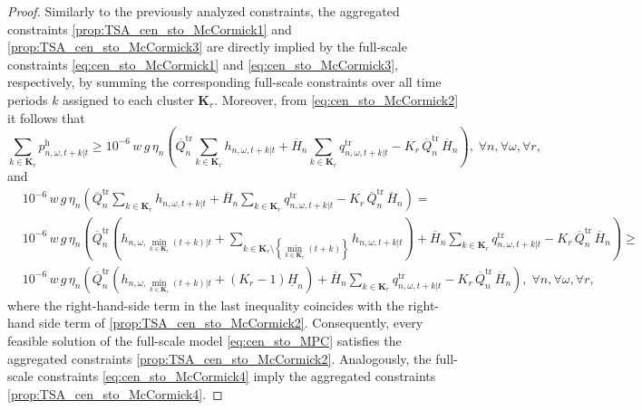 \documentclass[a4paper,fleqn]{cas-sc}
\begin{document}
\begin{proof}
Similarly to the previously analyzed constraints, the aggregated constraints 
\eqref{prop:TSA_cen_sto_McCormick1} and \eqref{prop:TSA_cen_sto_McCormick3}
are directly implied by the full-scale constraints
\eqref{eq:cen_sto_McCormick1} and \eqref{eq:cen_sto_McCormick3},
respectively, by summing the corresponding full-scale constraints over all time periods $k$ assigned to each cluster $\boldsymbol{K}_r$.
Moreover, from \eqref{eq:cen_sto_McCormick2} it follows that
\begin{equation}
\sum_{k \in \boldsymbol{K}_r} p^{\mathrm{h}}_{n, \omega, t+k|t}
\geq
10^{-6} \, w \, g \, \eta_n
\left(
\overline{Q}^{\mathrm{tr}}_{n} \sum_{k \in \boldsymbol{K}_r} h_{n, \omega, t+k|t} +
\overline{H}_{n} \sum_{k \in \boldsymbol{K}_r} q^{\mathrm{tr}}_{n, \omega, t+k|t} -
K_r \, \overline{Q}^{\mathrm{tr}}_{n} \, \overline{H}_{n}\right),
\; \forall n, \forall \omega, \forall r,
\end{equation}
and
\begin{align*}
& 10^{-6} \, w \, g \, \eta_n
\left(
\overline{Q}^{\mathrm{tr}}_{n} \sum_{k \in \boldsymbol{K}_r} h_{n, \omega, t+k|t} +
\overline{H}_{n} \sum_{k \in \boldsymbol{K}_r} q^{\mathrm{tr}}_{n, \omega, t+k|t} -
K_r \, \overline{Q}^{\mathrm{tr}}_{n} \, \overline{H}_{n}
\right)
= \\
& 10^{-6} \, w \, g \, \eta_n
\left(
\overline{Q}^{\mathrm{tr}}_{n} \left(h_{n, \omega, \min_{k \in \boldsymbol{K}_r}(t+k)|t} + \sum_{k \in \boldsymbol{K}_r \setminus \left\{\min_{k \in \boldsymbol{K}_r}(t+k)\right\}} h_{n, \omega, t+k|t}\right) +
\overline{H}_{n} \sum_{k \in \boldsymbol{K}_r} q^{\mathrm{tr}}_{n, \omega, t+k|t} -
K_r \, \overline{Q}^{\mathrm{tr}}_{n} \, \overline{H}_{n}
\right)
\geq\\
& 10^{-6} \, w \, g \, \eta_n
\left(
\overline{Q}^{\mathrm{tr}}_{n} \left(h_{n, \omega, \min_{k \in \boldsymbol{K}_r}(t+k)|t} + \left(K_r - 1\right) \underline{H}_n\right) +
\overline{H}_{n} \sum_{k \in \boldsymbol{K}_r} q^{\mathrm{tr}}_{n, \omega, t+k|t} -
K_r \, \overline{Q}^{\mathrm{tr}}_{n} \, \overline{H}_{n}
\right),
\; \forall n, \forall \omega, \forall r,
\end{align*}
where the right-hand-side term in the last inequality coincides with the right-hand side term of \eqref{prop:TSA_cen_sto_McCormick2}.
Consequently, every feasible solution of the full-scale model \eqref{eq:cen_sto_MPC} satisfies the aggregated constraints \eqref{prop:TSA_cen_sto_McCormick2}.
Analogously, the full-scale constraints \eqref{eq:cen_sto_McCormick4} imply the aggregated constraints \eqref{prop:TSA_cen_sto_McCormick4}.


\end{proof}
\end{document}
